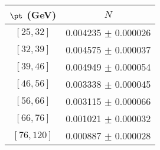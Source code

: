 \begin{tabular}{c||c}
$\pt$ (GeV) & $N$  \\
\hline
$[25, 32]$ & 0.004235 $\pm$ 0.000026\\
$[32, 39]$ & 0.004575 $\pm$ 0.000037\\
$[39, 46]$ & 0.004949 $\pm$ 0.000054\\
$[46, 56]$ & 0.003338 $\pm$ 0.000045\\
$[56, 66]$ & 0.003115 $\pm$ 0.000066\\
$[66, 76]$ & 0.001021 $\pm$ 0.000032\\
$[76, 120]$ & 0.000887 $\pm$ 0.000028\\
\end{tabular}

